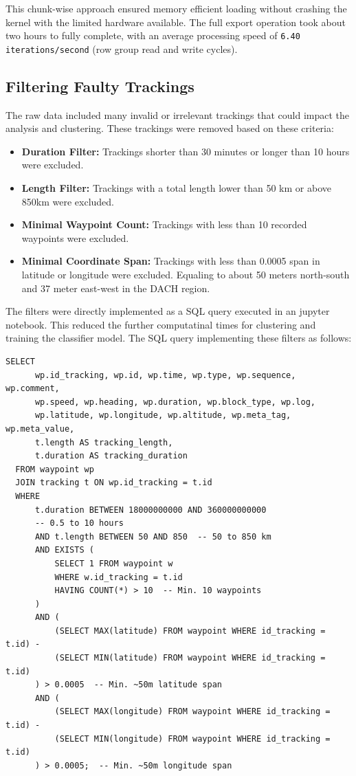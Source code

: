\documentclass[a4paper,12pt,twoside]{scrreprt}
\begin{document}
This chunk-wise approach ensured memory efficient loading without crashing the
kernel with the limited hardware available.
The full export operation took about two hours to fully complete, with an
average processing speed of \texttt{6.40 iterations/second} (row group read and
write cycles).

\subsection{Filtering Faulty Trackings}
The raw data included many invalid or irrelevant trackings that could impact
the analysis and clustering. These trackings were removed based on these
criteria:

\begin{itemize}
  \item \textbf{Duration Filter:} Trackings shorter than 30 minutes or longer
        than 10 hours were excluded.
  \item \textbf{Length Filter:} Trackings with a total length lower than 50 km
        or above 850km were excluded.
  \item \textbf{Minimal Waypoint Count:} Trackings with less than 10 recorded
        waypoints were excluded.
  \item \textbf{Minimal Coordinate Span:} Trackings with less than 0.0005 span
        in latitude or longitude were excluded. Equaling to about 50 meters
        north-south
        and 37 meter east-west in the DACH region.
\end{itemize}

The filters were directly implemented as a SQL query executed in an jupyter
notebook. This reduced the further computatinal times for clustering and
training the classifier model. The SQL query implementing these filters
as follows:
\begin{lstlisting}[style=sql,caption={SQL query used for filtering the GPS tracking dataset},label={lst:sql-filter}]
  SELECT
      wp.id_tracking, wp.id, wp.time, wp.type, wp.sequence, wp.comment,
      wp.speed, wp.heading, wp.duration, wp.block_type, wp.log,
      wp.latitude, wp.longitude, wp.altitude, wp.meta_tag, wp.meta_value,
      t.length AS tracking_length,
      t.duration AS tracking_duration
  FROM waypoint wp
  JOIN tracking t ON wp.id_tracking = t.id
  WHERE
      t.duration BETWEEN 18000000000 AND 360000000000
      -- 0.5 to 10 hours
      AND t.length BETWEEN 50 AND 850  -- 50 to 850 km
      AND EXISTS (
          SELECT 1 FROM waypoint w
          WHERE w.id_tracking = t.id
          HAVING COUNT(*) > 10  -- Min. 10 waypoints
      )
      AND (
          (SELECT MAX(latitude) FROM waypoint WHERE id_tracking = t.id) -
          (SELECT MIN(latitude) FROM waypoint WHERE id_tracking = t.id)
      ) > 0.0005  -- Min. ~50m latitude span
      AND (
          (SELECT MAX(longitude) FROM waypoint WHERE id_tracking = t.id) -
          (SELECT MIN(longitude) FROM waypoint WHERE id_tracking = t.id)
      ) > 0.0005;  -- Min. ~50m longitude span
  \end{lstlisting}
\end{document}
